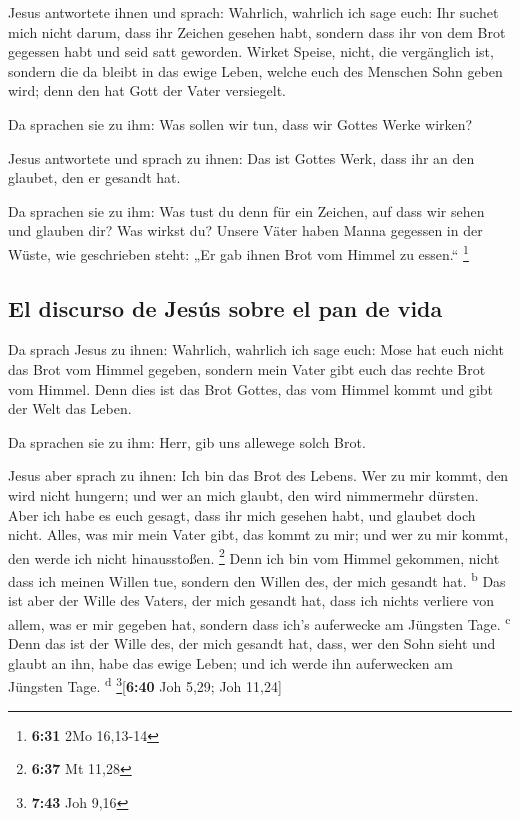  Jesus antwortete ihnen und sprach: Wahrlich, wahrlich
ich sage euch: Ihr suchet mich nicht darum, dass ihr Zeichen gesehen
habt, sondern dass ihr von dem Brot gegessen habt und seid satt
geworden.  Wirket Speise, nicht, die vergänglich ist,
sondern die da bleibt in das ewige Leben, welche euch des Menschen Sohn
geben wird; denn den hat Gott der Vater versiegelt.

 Da sprachen sie zu ihm: Was sollen wir tun, dass wir
Gottes Werke wirken?

 Jesus antwortete und sprach zu ihnen: Das ist Gottes
Werk, dass ihr an den glaubet, den er gesandt hat.

 Da sprachen sie zu ihm: Was tust du denn für ein
Zeichen, auf dass wir sehen und glauben dir? Was wirkst du?
 Unsere Väter haben Manna gegessen in der Wüste, wie
geschrieben steht: „Er gab ihnen Brot vom Himmel zu essen.`` \footnote{\textbf{6:31}
  2Mo 16,13-14}

\hypertarget{el-discurso-de-jesuxfas-sobre-el-pan-de-vida}{%
\subsection{El discurso de Jesús sobre el pan de
vida}\label{el-discurso-de-jesuxfas-sobre-el-pan-de-vida}}

 Da sprach Jesus zu ihnen: Wahrlich, wahrlich ich sage
euch: Mose hat euch nicht das Brot vom Himmel gegeben, sondern mein
Vater gibt euch das rechte Brot vom Himmel.  Denn dies
ist das Brot Gottes, das vom Himmel kommt und gibt der Welt das Leben.

 Da sprachen sie zu ihm: Herr, gib uns allewege solch
Brot.

 Jesus aber sprach zu ihnen: Ich bin das Brot des Lebens.
Wer zu mir kommt, den wird nicht hungern; und wer an mich glaubt, den
wird nimmermehr dürsten.  Aber ich habe es euch gesagt,
dass ihr mich gesehen habt, und glaubet doch nicht. 
Alles, was mir mein Vater gibt, das kommt zu mir; und wer zu mir kommt,
den werde ich nicht hinausstoßen. \footnote{\textbf{6:37} Mt 11,28}
 Denn ich bin vom Himmel gekommen, nicht dass ich meinen
Willen tue, sondern den Willen des, der mich gesandt hat.
\textsuperscript{b}  Das ist aber der Wille des Vaters,
der mich gesandt hat, dass ich nichts verliere von allem, was er mir
gegeben hat, sondern dass ich's auferwecke am Jüngsten Tage.
\textsuperscript{c}  Denn das ist der Wille des, der mich
gesandt hat, dass, wer den Sohn sieht und glaubt an ihn, habe das ewige
Leben; und ich werde ihn auferwecken am Jüngsten Tage.
\textsuperscript{d} \footnote{\textbf{7:43} Joh 9,16}{[}\textbf{6:40}
Joh 5,29; Joh 11,24{]}


